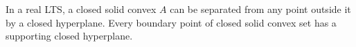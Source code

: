 In a real LTS, a closed solid convex $A$ can be separated from any point outside it by a closed hyperplane. Every boundary point of closed solid convex set has a supporting closed hyperplane.
